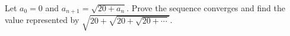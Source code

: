 Let $a_0=0$ and $a_{n+1}=\sqrt{20+a_n}$. Prove the sequence converges and find the value represented by $\sqrt{20+\sqrt{20+\sqrt{20+\cdots}}}$.
